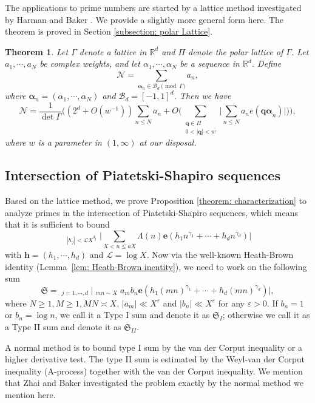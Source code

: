 \documentclass[12pt, reqno, twoside, letterpaper]{amsart}
\numberwithin{equation}{section}
\newcommand{\e}{\ensuremath{\mathbf{e}}}
\newcommand{\cB}{\ensuremath{\mathcal{B}}}
\newcommand{\cL}{\ensuremath{\mathcal{L}}}
\newcommand{\cN}{\ensuremath{\mathcal{N}}}
\newcommand{\RR}{\ensuremath{\mathbb{R}}}
\theoremstyle{customthm}
\newtheorem{theorem}[X]{Theorem}
\theoremstyle{customrem}
\renewcommand{\ge}{\ensuremath{\geqslant}}
\begin{document}
The applications to prime numbers are started by a lattice method investigated by Harman \cite{Harman1993} and Baker \cite{Baker2014}. We provide a slightly more general form here.  The theorem is proved in Section \ref{subsection: polar Lattice}.

\begin{theorem}\label{theorem: polar}
	Let $\Gamma$ denote a lattice in $\RR^d$ and $\Pi$ denote the polar lattice of $\Gamma$. Let $a_1,\cdots,a_N$ be complex weights, and let $\alpha_1,\cdots,\alpha_N$ be a sequence in
	$\mathbb{R}^d$. Define
	$$
	\cN = \sum_{\boldsymbol{\alpha}_n \in \cB_d \pmod{\Gamma}} a_n,
	$$
	where $\boldsymbol{\alpha}_n=(\alpha_1,\cdots,\alpha_N)$ and $\cB_d=[-1,1]^d$. Then we have
	$$
	\cN = \frac{1}{\det\Gamma} \bigg( (2^d + O(w^{-1}))
	\sum_{n\leqslant N}a_n + O\bigg( \sum_{\substack{\boldsymbol{q}\in\Pi \\ 0<|\boldsymbol{q}|<w}} \bigg| \sum_{n\leqslant N}a_ne(\boldsymbol{q \alpha}_n) \bigg| \bigg) \bigg),
	$$
	where $w$ is a parameter in $(1,\infty)$ at our disposal.
\end{theorem}


\subsection{Intersection of Piatetski-Shapiro sequences}
Based on the lattice method, we prove Proposition \ref{theorem: characterization} to analyze primes in the intersection of Piatetski-Shapiro sequences, which means that it is sufficient to bound
$$
\mathop{\sum_{\boldsymbol{h}\in\mathbb{Z}^d\setminus\{\boldsymbol{0}\}}}
_{|h_j|<\mathcal{L}X^{\delta_j}}\Bigg|\sum_{X < n \leqslant aX}\Lambda(n)
\mathbf{e}\left(h_1n^{\gamma_1}+\cdots+h_dn^{\gamma_d}\right)\Bigg|
$$
with $\boldsymbol{h}=(h_1,\cdots,h_d)$ and $\cL = \log X$.
Now via the well-known Heath-Brown identity (Lemma~\ref{lem: Heath-Brown inentity}), we need to work on the following sum
$$
\mathfrak{S}=\mathop{\sum_{0<|h_j|<X^{\delta_j}\mathcal{L}}}_{j=1,\cdots,d}
\Bigg|\mathop{{\sum_{m \sim M} \sum_{n \sim N}}}_{mn \sim X} a_m b_n \e \left(
h_1(mn)^{\gamma_1}+\cdots+h_d(mn)^{\gamma_d}\right)\Bigg|,
$$
where $N \ge 1, M \ge 1, MN \asymp X$, $|a_m|\ll X^{\varepsilon}$ and $|b_n|\ll X^{\varepsilon}$
for any $\varepsilon>0$. If $b_n=1$ or $b_n=\log n$, we call it a Type I sum and denote it as $\mathfrak{S}_{I}$; otherwise we call it as a Type II sum and denote it as $\mathfrak{S}_{II}$.

A normal method is to bound type I sum by the van der Corput inequality or a higher derivative test. The type II sum is estimated by the Weyl-van der Corput inequality (A-process) together with the van der Corput inequality. We mention that Zhai \cite{Zhai1999} and Baker \cite{Baker2014} investigated the problem exactly by the normal method we mention here.
\end{document}
